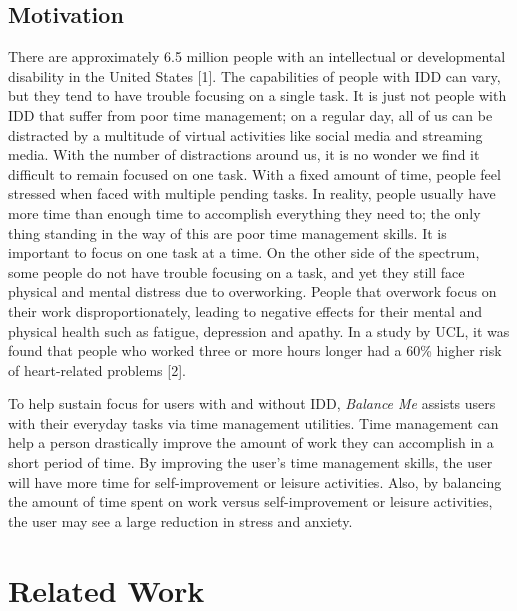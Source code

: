 \documentclass{sigchi}
\begin{document}
\subsection{Motivation}

There are approximately 6.5 million people with an intellectual or
developmental disability in the United States [1]. The capabilities of people
with IDD can vary, but they tend to have trouble focusing on a single task. It
is just not people with IDD that suffer from poor time management; on a regular
day, all of us can be distracted by a multitude of virtual activities like
social media and streaming media. With the number of distractions around us, it
is no wonder we find it difficult to remain focused on one task. With a fixed
amount of time, people feel stressed when faced with multiple pending tasks. In
reality, people usually have more time than enough time to accomplish
everything they need to; the only thing standing in the way of this are poor
time management skills. It is important to focus on one task at a time. On the
other side of the spectrum, some people do not have trouble focusing on a task,
and yet they still face physical and mental distress due to overworking. People
that overwork focus on their work disproportionately, leading to negative
effects for their mental and physical health such as fatigue, depression and
apathy. In a study by UCL, it was found that people who worked three or more
hours longer had a 60\% higher risk of heart-related problems [2].

To help sustain focus for users with and without IDD, \textit{Balance Me}
assists users with their everyday tasks via time management utilities. Time
management can help a person drastically improve the amount of work they can
accomplish in a short period of time. By improving the user’s time management
skills, the user will have more time for self-improvement or leisure
activities. Also, by balancing the amount of time spent on work versus
self-improvement or leisure activities, the user may see a large reduction in
stress and anxiety.


\section{Related Work}
\end{document}
